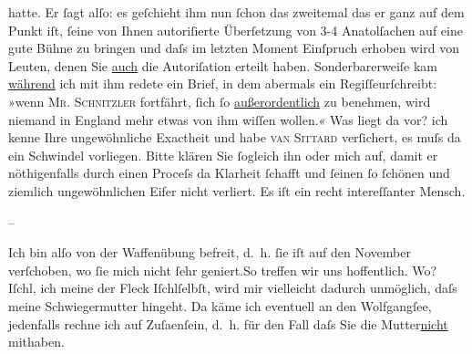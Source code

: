                hatte. Er{ }ſagt alſo: es geſchieht ihm nun{ }ſchon das zweitemal das er ganz auf dem
               Punkt iſt,{ }ſeine von Ihnen autoriſierte Überſetzung von 3-4 Anatolſachen auf eine {\pb}gute Bühne zu bringen und daſs im
               letzten Moment Einſpruch erhoben wird von Leuten, denen Sie \uline{auch} die Autoriſation erteilt haben. Sonderbarerweiſe kam \uline{während} ich mit ihm redete ein Brief, in dem abermals ein
                  Regiſſeurſchreibt: »wenn \textsc{Mr.
                  Schnitzler} fortfährt,{ }ſich{ }ſo \uline{außerordentlich}
               zu benehmen, wird niemand in England mehr etwas
               von ihm wiſſen {\pb}wollen.« Was liegt
               da vor? ich kenne Ihre ungewöhnliche Exactheit und habe \textsc{van Sittard} verſichert, es muſs da ein Schwindel vorliegen. Bitte klären Sie{ }ſogleich ihn
               oder mich auf, damit er nöthigenfalls durch einen Proceſs da Klarheit{ }ſchafft und{ }ſeinen{ }ſo{ }ſchönen und ziemlich ungewöhnlichen Eifer nicht verliert. Es iſt ein recht
               intereſſanter Mensch.\pend
           
\pstart
           \centering{}{\pb}–\pend
           
\pstart
           Ich bin alſo von der Waffenübung befreit, d. h.{ }ſie iſt auf den November
               verſchoben, wo{ }ſie mich nicht{ }ſehr geniert.\hspace*{1.5em}So
               treffen wir uns hoffentlich. Wo? Iſchl, ich meine
               der Fleck Iſchlſelbſt, wird mir vielleicht dadurch unmöglich, daſs
               meine Schwiegermutter
               hingeht. Da käme ich eventuell an den Wolfgangſee, jedenfalls rechne ich auf Zuſa{\geminationm}enſein, d. h. für den Fall daſs Sie die Mutter\uline{nicht} mithaben.\pend
           

